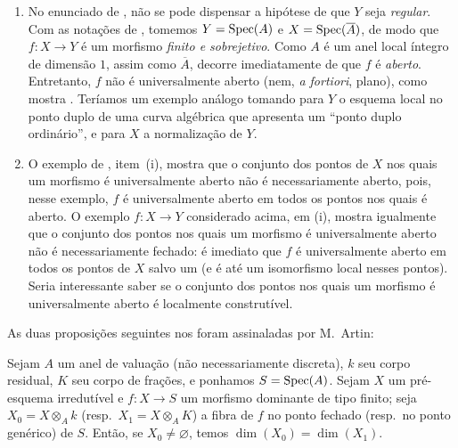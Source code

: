 \begin{remarks}[14.3.9]
\label{IV.14.3.9}
\begin{enumerate}[label=(\roman*)]
  \item No enunciado de , não se pode dispensar a hipótese de que $Y$ seja \emph{regular}.
  Com as notações de , tomemos $Y=\operatorname{Spec}(A)$ e $X=\operatorname{Spec}(\overline{A})$, de modo que $f:X\to Y$ é um morfismo \emph{finito e sobrejetivo}.
  Como $A$ é um anel local íntegro de dimensão $1$, assim como $\overline{A}$, decorre imediatamente de  que $f$ é \emph{aberto}.
  Entretanto, $f$ não é universalmente aberto (nem, \emph{a fortiori}, plano), como mostra .
  Teríamos um exemplo análogo tomando para $Y$ o esquema local no ponto duplo de uma curva algébrica que apresenta um “ponto duplo ordinário”, e para $X$ a normalização de $Y$.

  \item O exemplo de , item~(i), mostra que o conjunto dos pontos de $X$ nos quais um morfismo é universalmente aberto não é necessariamente aberto, pois, nesse exemplo, $f$ é universalmente aberto em todos os pontos nos quais é aberto.
  O exemplo $f:X\to Y$ considerado acima, em (i), mostra igualmente que o conjunto dos pontos nos quais um morfismo é universalmente aberto não é necessariamente fechado: é imediato que $f$ é universalmente aberto em todos os pontos de $X$ salvo um (e é até um isomorfismo local nesses pontos).
  Seria interessante saber se o conjunto dos pontos nos quais um morfismo é universalmente aberto é localmente construtível.
\end{enumerate}
\end{remarks}

As duas proposições seguintes nos foram assinaladas por M.~Artin:

\begin{lemma}[14.3.10]
\label{IV.14.3.10}
Sejam $A$ um anel de valuação (não necessariamente discreta), $k$ seu corpo residual, $K$ seu corpo de frações, e ponhamos $S=\operatorname{Spec}(A)$.
Sejam $X$ um pré-esquema irredutível e $f:X\to S$ um morfismo dominante de tipo finito; seja $X_0=X\otimes_A k$ (resp.\ $X_1=X\otimes_A K$) a fibra de $f$ no ponto fechado (resp.\ no ponto genérico) de $S$.
Então, se $X_0\neq\varnothing$, temos $\dim(X_0)=\dim(X_1)$.
\end{lemma}

